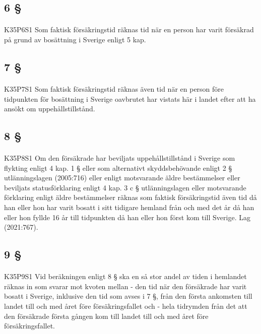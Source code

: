 \documentclass[a4paper,notitlepage,openany,10pt]{book}
\begin{document}
\subsection*{6 §}
\paragraph*{}
{\tiny K35P6S1}
Som faktisk försäkringstid räknas tid när en person har varit försäkrad på grund av bosättning i Sverige enligt 5 kap.
\subsection*{7 §}
\paragraph*{}
{\tiny K35P7S1}
Som faktisk försäkringstid räknas även tid när en person före tidpunkten för bosättning i Sverige oavbrutet har vistats här i landet efter att ha ansökt om uppehållstillstånd.
\subsection*{8 §}
\paragraph*{}
{\tiny K35P8S1}
Om den försäkrade har beviljats uppehållstillstånd i Sverige som flykting enligt 4 kap. 1 § eller som alternativt skyddsbehövande enligt 2 § utlänningslagen (2005:716) eller enligt motsvarande äldre bestämmelser eller beviljats statusförklaring enligt 4 kap. 3 c § utlänningslagen eller motsvarande förklaring enligt äldre bestämmelser räknas som faktisk försäkringstid även tid då han eller hon har varit bosatt i sitt tidigare hemland från och med det år då han eller hon fyllde 16 år till tidpunkten då han eller hon först kom till Sverige.
Lag (2021:767).
\subsection*{9 §}
\paragraph*{}
{\tiny K35P9S1}
Vid beräkningen enligt 8 § ska en så stor andel av tiden i hemlandet räknas in som svarar mot kvoten mellan
\newline - den tid när den försäkrade har varit bosatt i Sverige, inklusive den tid som avses i 7 §, från den första ankomsten till landet till och med året före försäkringsfallet och
\newline - hela tidrymden från det att den försäkrade första gången kom till landet till och med året före försäkringsfallet.
\end{document}
